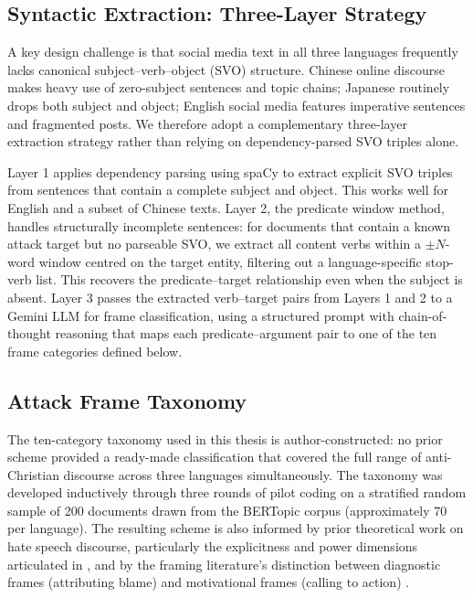 \documentclass[../CLthesis.tex]{subfiles}
\begin{document}
\subsection{Syntactic Extraction: Three-Layer Strategy}

A key design challenge is that social media text in all three languages frequently lacks canonical subject--verb--object (SVO) structure. Chinese online discourse makes heavy use of zero-subject sentences and topic chains; Japanese routinely drops both subject and object; English social media features imperative sentences and fragmented posts. We therefore adopt a complementary three-layer extraction strategy rather than relying on dependency-parsed SVO triples alone.

Layer 1 applies dependency parsing using spaCy to extract explicit SVO triples from sentences that contain a complete subject and object. This works well for English and a subset of Chinese texts. Layer 2, the predicate window method, handles structurally incomplete sentences: for documents that contain a known attack target but no parseable SVO, we extract all content verbs within a $\pm N$-word window centred on the target entity, filtering out a language-specific stop-verb list. This recovers the predicate--target relationship even when the subject is absent. Layer 3 passes the extracted verb--target pairs from Layers 1 and 2 to a Gemini LLM for frame classification, using a structured prompt with chain-of-thought reasoning that maps each predicate--argument pair to one of the ten frame categories defined below.

\subsection{Attack Frame Taxonomy}
\label{sec:rq2-taxonomy}

The ten-category taxonomy used in this thesis is author-constructed: no prior scheme provided a ready-made classification that covered the full range of anti-Christian discourse across three languages simultaneously. The taxonomy was developed inductively through three rounds of pilot coding on a stratified random sample of 200 documents drawn from the BERTopic corpus (approximately 70 per language). The resulting scheme is also informed by prior theoretical work on hate speech discourse, particularly the explicitness and power dimensions articulated in \citet{matamoros-fernandez_racism_2021}, and by the framing literature's distinction between diagnostic frames (attributing blame) and motivational frames (calling to action) \citep{Mendelsohn_2024}.
\end{document}
